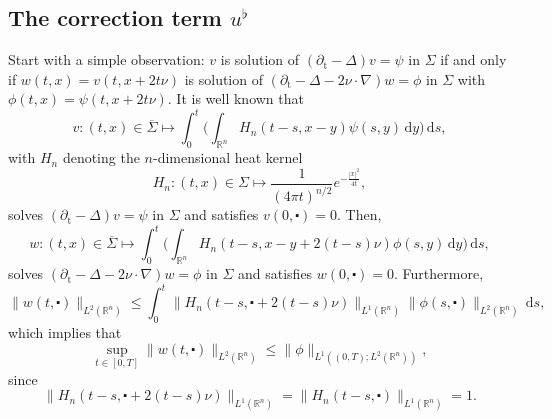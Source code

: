\documentclass[10pt,a4paper]{amsart}
\theoremstyle{remark}
\theoremstyle{definition}
\newcommand{\R}{\mathbb{R}}
\newcommand{\dd}{\mathrm{d}}
\newcommand{\tm}{\mathrm{t}}
\newcommand{\marnote}[1]{\marginpar{\footnotesize #1}} %
\begin{document}

\subsection{The correction term \texorpdfstring{$u^\flat$}{uflat}}
Start with a simple observation: $v$ is solution of
$(\partial_\tm - \Delta) v = \psi$ in $\Sigma$ if and only if
$w (t, x) = v (t, x + 2t \nu)$ is solution of $(\partial_\tm - \Delta - 2 \nu \cdot \nabla) w = \phi $ in
$\Sigma$ with $\phi (t, x) = \psi (t, x + 2t \nu)$.
It is well known that
\[ v: (t, x) \in \overline{\Sigma} \longmapsto \int_0^t \Big( \int_{\R^n} H_n (t-s, x-y) \psi(s, y) \, \dd y \Big) \, \dd s, \]
with $H_n$ denoting the $n$-dimensional heat kernel
\begin{equation}
\label{id:heat_kernel}
H_n: (t, x) \in \Sigma \longmapsto \frac{1}{(4\pi t)^{n/2}} e^{-\frac{|x|^2}{4t}},
\end{equation}
solves $(\partial_\tm - \Delta) v = \psi$ in $\Sigma$ and satisfies
$v(0, \centerdot) = 0$. Then,
\[ w: (t, x) \in \overline{\Sigma} \longmapsto \int_0^t \Big( \int_{\R^n} H_n (t-s, x - y + 2(t-s) \nu) \phi(s, y) \, \dd y \Big) \, \dd s, \]
solves $(\partial_\tm - \Delta - 2 \nu \cdot \nabla) w = \phi $ in $\Sigma$ 
and satisfies $w(0, \centerdot) = 0$. Furthermore,
\[ \|w(t, \centerdot)\|_{L^2(\R^n)} \leq \int_0^t \| H_n (t-s, \centerdot + 2(t-s) \nu) \|_{L^1(\R^n)} \| \phi(s, \centerdot)\|_{L^2(\R^n)} \, \dd s,\]
which implies that
\[ \sup_{t \in [0, T]} \|w(t, \centerdot)\|_{L^2(\R^n)} \leq \| \phi\|_{L^1((0,T); L^2(\R^n))}, \]
since
\begin{equation}
\label{id:heat_L1_tranlation-invariant}
\| H_n (t-s, \centerdot + 2(t-s) \nu) \|_{L^1(\R^n)} = \| H_n (t-s, \centerdot) \|_{L^1(\R^n)} = 1.
\end{equation}
\end{document}
